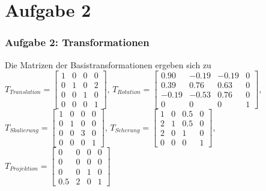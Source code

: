 \documentclass[accentcolor=tud9c,colorbacktitle,inverttitle,landscape,german,presentation,t]{tudbeamer}
\begin{document}
\section{Aufgabe 2}
\begin{frame}
	\frametitle{Aufgabe 2: Transformationen}
	Die Matrizen der Basistransformationen ergeben sich zu
	$T_{Translation}=\begin{bmatrix}
	1 & 0 & 0 & 0\\
	0 & 1 & 0 & 2\\
	0 & 0 & 1 & 0\\
	0 & 0 & 0 & 1
	\end{bmatrix} $, 
	$T_{Rotation}=\begin{bmatrix}
	0.90 & -0.19 & -0.19 & 0\\
	0.39 & 0.76 & 0.63 & 0\\
	-0.19 & -0.53 & 0.76 & 0\\
	0 & 0 & 0 & 1
	\end{bmatrix} $, 
	$T_{Skalierung}=\begin{bmatrix}
	1 & 0 & 0 & 0\\
	0 & 1 & 0 & 0\\
	0 & 0 & 3 & 0\\
	0 & 0 & 0 & 1
	\end{bmatrix} $, 
	$T_{Scherung}=\begin{bmatrix}
	1 & 0 & 0.5 & 0\\
	2 & 1 & 0.5 & 0\\
	2 & 0 & 1 & 0\\
	0 & 0 & 0 & 1
	\end{bmatrix} $,
	 $T_{Projektion}=\begin{bmatrix}
	 0 & 0 & 0 & 0\\
	 0 & 0 & 0 & 0\\
	 0 & 0 & 1 & 0\\
	 0.5 & 2 & 0 & 1
	 \end{bmatrix} $\\

\end{frame}
\end{document}
